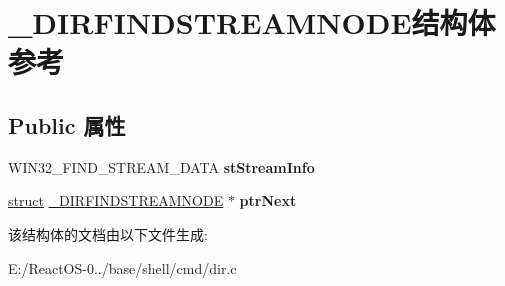 \hypertarget{struct___d_i_r_f_i_n_d_s_t_r_e_a_m_n_o_d_e}{}\section{\+\_\+\+D\+I\+R\+F\+I\+N\+D\+S\+T\+R\+E\+A\+M\+N\+O\+D\+E结构体 参考}
\label{struct___d_i_r_f_i_n_d_s_t_r_e_a_m_n_o_d_e}
\subsection*{Public 属性}
\begin{DoxyCompactItemize}
\item 
\mbox{\label{struct___d_i_r_f_i_n_d_s_t_r_e_a_m_n_o_d_e_a1a193e55840e9635378109f3b9de85d9}} 
W\+I\+N32\+\_\+\+F\+I\+N\+D\+\_\+\+S\+T\+R\+E\+A\+M\+\_\+\+D\+A\+TA {\bfseries st\+Stream\+Info}
\item 
\mbox{\label{struct___d_i_r_f_i_n_d_s_t_r_e_a_m_n_o_d_e_a0fcf2a638904c9209ae42a03e461f72d}} 
\hyperlink{interfacestruct}{struct} \hyperlink{struct___d_i_r_f_i_n_d_s_t_r_e_a_m_n_o_d_e}{\+\_\+\+D\+I\+R\+F\+I\+N\+D\+S\+T\+R\+E\+A\+M\+N\+O\+DE} $\ast$ {\bfseries ptr\+Next}
\end{DoxyCompactItemize}


该结构体的文档由以下文件生成\+:\begin{DoxyCompactItemize}
\item 
E\+:/\+React\+O\+S-\/0../base/shell/cmd/dir.\+c\end{DoxyCompactItemize}
